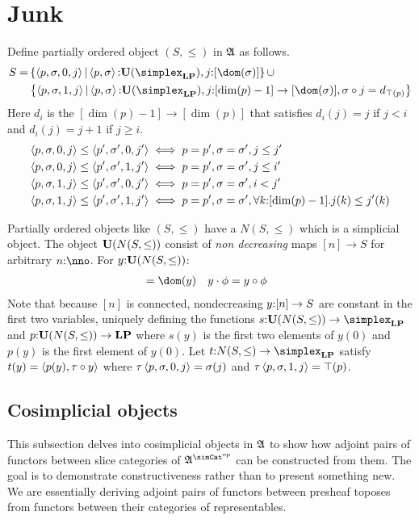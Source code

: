\documentclass[csh.tex]{subfiles}
\begin{document}
\section{Junk}
\begin{definition}
Define partially ordered object $(S,\leq)$ in $\mathfrak A$ as follows.
\begin{align*} 
S =& \set{\tuplet{p,\sigma,0,j}|\tuplet{p,\sigma}\of\base(\simplex_\LP),j\of[\dom(\sigma)]}\cup\\&
\set{\tuplet{p,\sigma,1,j}|\tuplet{p,\sigma}\of\base(\simplex_\LP),
j\of[\dim(p)-1]\to [\dom(\sigma)],\sigma\circ j = d_{\top(p)}}\\
\end{align*}
Here $d_i$ is the  $[\dim(p)-1]\to[\dim(p)]$ that satisfies $d_i(j) = j$ if $j<i$ and $d_i(j) = j+1$ if $j\geq i$.
\begin{align*}
\left\langle p,\sigma,0,j \right\rangle\leq\left\langle p',\sigma',0,j' \right\rangle &
\iff p=p',\sigma=\sigma',j\leq j'\\
\left\langle p,\sigma,0,j \right\rangle\leq\left\langle p',\sigma',1,j' \right\rangle &
\iff p=p',\sigma=\sigma',j \leq i'\\ 
\left\langle p,\sigma,1,j \right\rangle\leq\left\langle p',\sigma',0,j' \right\rangle &
\iff p=p',\sigma=\sigma',i < j'\\ 
\left\langle p,\sigma,1,j \right\rangle\leq\left\langle p',\sigma',1,j' \right\rangle &
\iff p=p',\sigma=\sigma',\forall k\mathord :[\dim(p)-1].j(k)\leq j'(k)
\end{align*}

Partially ordered objects like $(S,\leq)$ have a  $N(S,\leq)$ which is a simplicial object. The object $\mathbf{U}(N(S,\leq))$ consist of \emph{non decreasing} maps $[n]\to S$ for arbitrary $n\of\nno$. For $y\mathord : \mathbf{U}(N(S,\leq))$:
\begin{align*}
[\dim(y)] &= \dom(y)&
y\cdot \phi &= y\circ \phi
\end{align*}
Note that because $[n]$ is connected, nondecreasing $y\mathord :[n]\to S$ are constant in the first two variables, uniquely defining the functions $s\of \base(N(S,\leq))\to \simplex_\LP$ and $p\mathord : \mathbf{U}(N(S,\leq))\to \mathbf{LP}$
where $s(y)$ is the first two elements of $y(0)$ and $p(y)$ is the first element of $y(0)$. Let $t\of N(S,\leq)\to \simplex_\LP$ satisfy 
$t(y) = \left\langle p(y),\tau\circ y \right\rangle$ where $\tau\left\langle p,\sigma,0,j \right\rangle = \sigma(j)$ and $\tau\left\langle p,\sigma,1,j \right\rangle = \top(p)$.

\end{definition}




\subsection{Cosimplicial objects}
This subsection delves into cosimplicial objects in $\mathfrak A$ to show how adjoint pairs of functors between slice categories of $\ambient\s$ can be constructed from them. The goal is to demonstrate constructiveness rather than to present something new. We are essentially deriving adjoint pairs of functors between presheaf toposes from functors between their categories of representables.
\end{document}
